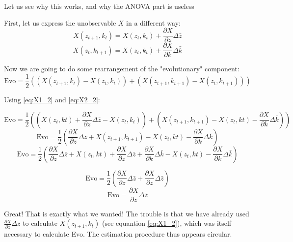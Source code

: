 Let us see why this works, and why the ANOVA part is useless

First, let us express the unobservable $X$ in a different way:
\begin{equation} \label{eq:X1_2}
X(z_{t+1},k_{t})=X(z_{t},k_{t})+\frac{\partial X}{\partial z} \Delta \bar{z}
\end{equation}
\begin{equation} \label{eq:X2_2}
X(z_{t},k_{t+1})=X(z_{t},k_{t})+\frac{\partial X}{\partial k} \Delta \bar{k}
\end{equation}

Now we are going to do some rearrangement of the "evolutionary" component:
\begin{equation}
\mathrm{Evo}=\frac{1}{2}((X(z_{t+1},k_{t})-X(z_{t},k_{t}))+(X(z_{t+1},k_{t+1})-X(z_{t},k_{t+1})))
\end{equation}

Using \eqref{eq:X1_2} and \eqref{eq:X2_2}:

\begin{equation}
\mathrm{Evo}=\frac{1}{2}((X(z_{t},k{t})+\frac{\partial X}{\partial z} \Delta \bar{z}-X(z_{t},k_{t}))+(X(z_{t+1},k_{t+1})-X(z_{t},k{t})-\frac{\partial X}{\partial k} \Delta \bar{k}))
\end{equation}
\begin{equation}
\mathrm{Evo}=\frac{1}{2}(\frac{\partial X}{\partial z} \Delta \bar{z}+X(z_{t+1},k_{t+1})-X(z_{t},k{t})-\frac{\partial X}{\partial k} \Delta \bar{k})
\end{equation}
\begin{equation}
\mathrm{Evo}=\frac{1}{2}(\frac{\partial X}{\partial z} \Delta \bar{z}+X(z_{t},k{t})+\frac{\partial X}{\partial z} \Delta \bar{z} +  \frac{\partial X}{\partial k} \Delta \bar{k}-X(z_{t},k{t})-\frac{\partial X}{\partial k} \Delta \bar{k})
\end{equation}

\begin{equation}
\mathrm{Evo}=\frac{1}{2}(\frac{\partial X}{\partial z} \Delta \bar{z}+\frac{\partial X}{\partial z} \Delta \bar{z})
\end{equation}
\begin{equation}
\mathrm{Evo}=\frac{\partial X}{\partial z} \Delta \bar{z}
\end{equation}

Great! That is exactly what we wanted! The trouble is that we have already used $\frac{\partial X}{\partial z} \Delta \bar{z}$ to calculate $X(z_{t+1},k_{t})$ (see equantion \ref{eq:X1_2}), which was itself necessary to calculate Evo. The estimation procedure thus appears circular.

